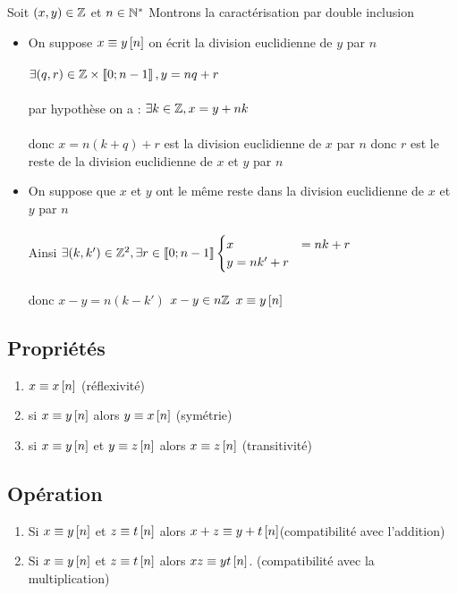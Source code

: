\begin{dem}
	Soit \(\left(x,y\right) \in \mathbb{Z}\) et \(n \in \mathbb{N}^*\) Montrons la caractérisation par double inclusion
	\begin{itemize}
		\item \impdir On suppose \(x \equiv y \left[n\right]\) on écrit la division euclidienne de \(y\) par \(n\)\\~\\
		      \(\exists (q,r) \in \mathbb{Z} \times \left\llbracket0;n-1\right\rrbracket, y =nq+r\)\\~\\
		      par hypothèse on a : \(\exists k \in \mathbb{Z}, x = y + nk\)\\~\\
		      donc \(x = n(k+q)+r\) est la division euclidienne de \(x\) par \(n\) donc \(r\) est le reste de la division euclidienne de \(x\) et \(y\) par \(n\)
		\item \imprec On suppose que \(x\) et \(y\) ont le même reste dans la division euclidienne de \(x\) et \(y\) par \(n\) \\~\\
		      Ainsi \(\exists(k,k') \in \mathbb{Z}^2, \exists r \in \left\llbracket0;n-1\right\rrbracket \begin{cases}
			      x & = nk+r \\
			      y = nk' +r
		      \end{cases}\)\\~\\
		      donc \(x-y = n(k-k')\) \ie \(x-y \in n\mathbb{Z}\) \ie \(x \equiv y \left[n\right]\)
	\end{itemize}
\end{dem}

\subsection{Propriétés}
\begin{defprop}
	\begin{enumerate}
		\item \(x \equiv x \left[n\right]\) \hfill (réflexivité)
		\item si \(x \equiv y \left[n\right]\) alors \(y \equiv x \left[n\right]\) \hfill(symétrie)
		\item si \(x \equiv y \left[n\right] \) et \(y \equiv z \left[n\right]\) alors \(x \equiv z \left[n\right]\) \hfill(transitivité)
	\end{enumerate}
\end{defprop}

\subsection{Opération}
\begin{defprop}
	\begin{enumerate}
		\item  Si \(x \equiv y \left[n\right] \) et \(z \equiv t \left[n\right] \) alors \(x+z \equiv y+t \left[n\right] \)\hfill (compatibilité avec l’addition)
		\item  Si \(x \equiv y \left[n\right] \) et \(z \equiv t \left[n\right] \) alors \(xz \equiv yt \left[n\right] \). \hfill(compatibilité avec la multiplication)
	\end{enumerate}
\end{defprop}


